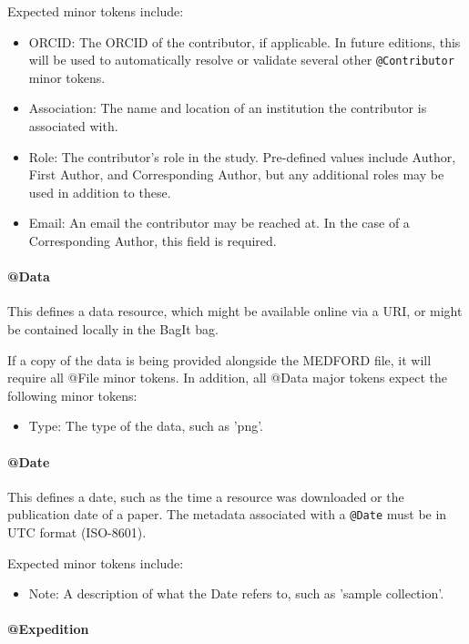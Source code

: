 \documentclass[10pt]{article}
\begin{document}
    Expected minor tokens include:
    \begin{itemize}
        \item ORCID: The ORCID of the contributor, if applicable. In future editions, this will be used to automatically resolve or validate several other \texttt{@Contributor} minor tokens.
        \item Association: The name and location of an institution the contributor is associated with.
        \item Role: The contributor's role in the study. Pre-defined values include Author, First Author, and Corresponding Author, but any additional roles may be used in addition to these.
        \item Email: An email the contributor may be reached at. In the case of a Corresponding Author, this field is required.
    \end{itemize}
    
    \paragraph{@Data}
    
    This defines a data resource, which might be available online via a URI, or might be contained locally in the BagIt bag.
    
    If a copy of the data is being provided alongside the MEDFORD file, it will require all @File minor tokens. In addition, all @Data major tokens expect the following minor tokens:
    \begin{itemize}
        \item Type: The type of the data, such as 'png'.
    \end{itemize}
    
    \paragraph{@Date}
    
    This defines a date, such as the time a resource was downloaded or the publication date of a paper. The metadata associated with a \texttt{@Date} must be in UTC format (ISO-8601).
    
    Expected minor tokens include:
    \begin{itemize}
        \item Note: A description of what the Date refers to, such as 'sample collection'.
    \end{itemize}
    
    \paragraph{@Expedition}
    
\end{document}
